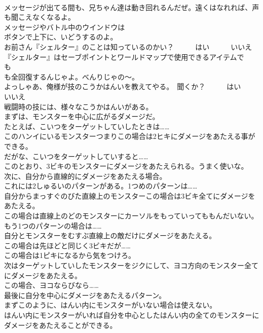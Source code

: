 \documentclass[8pt]{extreport}
\begin{document}
\begin{CJK}{UTF8}{min}
\\	メッセージが出てる間も、兄ちゃん達は動き回れるんだぜ。遠くはなれれば、声も聞こえなくなるよ。	
\\	メッセージやバトル中のウインドウは
\\	ボタンで上下に、いどうするのよ。	
\\	お前さん『シェルター』のことは知っているのかい？　　　はい　　　いいえ	
\\	『シェルター』はセーブポイントとワールドマップで使用できるアイテムで
\\	も
\\	も全回復するんじゃよ。べんりじゃの～。	
\\	よっしゃあ、俺様が技のこうかはんいを教えてやる。　聞くか？　　　はい　　　いいえ	
\\	戦闘時の技には、様々なこうかはんいがある。	
\\	まずは、モンスターを中心に広がるダメージだ。	
\\	たとえば、こいつをターゲットしていしたときは……	
\\	このハンイにいるモンスターつまりこの場合は2ヒキにダメージをあたえる事ができる。	
\\	だがな、こいつをターゲットしていすると……	
\\	このとおり、3ビキのモンスターにダメージをあたえられる。うまく使いな。	
\\	次に、自分から直線的にダメージをあたえる場合。	
\\	これには2しゅるいのパターンがある。1つめのパターンは……	
\\	自分からまっすぐのびた直線上のモンスターこの場合は3ビキ全てにダメージをあたえる。	
\\	この場合は直線上のどのモンスターにカーソルをもっていってももんだいない。	
\\	もう1つのパターンの場合は……	
\\	自分とモンスターをむすぶ直線上の敵だけにダメージをあたえる。	
\\	この場合は先ほどと同じく3ビキだが……	
\\	この場合は1ピキになるから気をつけろ。	
\\	次はターゲットしていしたモンスターをジクにして、ヨコ方向のモンスター全てにダメージをあたえる。	
\\	この場合、ヨコならびなら……	
\\	最後に自分を中心にダメージをあたえるパターン。	
\\	まずこのように、はんい内にモンスターがいない場合は使えない。	
\\	はんい内にモンスターがいれば自分を中心としたはんい内の全てのモンスターにダメージをあたえることができる。	

\end{CJK}
\end{document}
